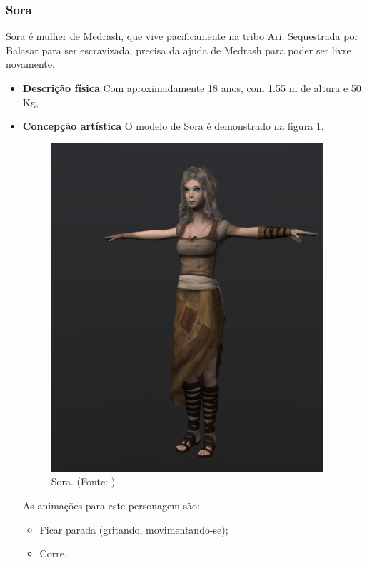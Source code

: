 \subsubsection{Sora}
Sora é mulher de Medrash, que vive pacificamente na tribo Ari. Sequestrada
 por Balasar para ser escravizada, precisa da ajuda de Medrash para poder
 ser livre novamente.
\begin{itemize}
\item {\bf Descrição física}
Com aproximadamente 18 anos, com 1.55 m de altura e 50 Kg, 
\item {\bf Concepção artística}
O modelo de Sora é demonstrado na figura \ref{img:sora}.

\begin{figure}[H]
 \centering
 \includegraphics[scale=0.8]{Imagens/sora01.png}
 \caption{Sora. (Fonte: \cite{bib:sora01})}
\label{img:sora}
\end{figure}


As animações para este personagem são:
\begin{itemize}
\item Ficar parada (gritando, movimentando-se);
\item Corre.
\end{itemize}
\end{itemize}


